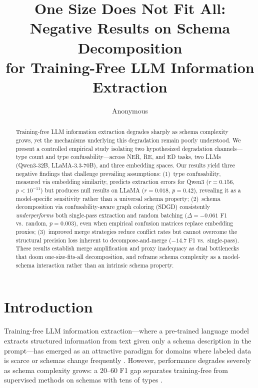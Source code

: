 \documentclass[11pt,a4paper]{article}
\title{One Size Does Not Fit All: Negative Results on Schema Decomposition\\for Training-Free LLM Information Extraction}
\author{Anonymous}
\date{}
\begin{document}
\maketitle

\begin{abstract}
Training-free LLM information extraction degrades sharply as schema complexity grows, yet the mechanisms underlying this degradation remain poorly understood. We present a controlled empirical study isolating two hypothesized degradation channels---type count and type confusability---across NER, RE, and ED tasks, two LLMs (Qwen3-32B, LLaMA-3.3-70B), and three embedding spaces. Our results yield three negative findings that challenge prevailing assumptions: (1)~type confusability, measured via embedding similarity, predicts extraction errors for Qwen3 ($r{=}0.156$, $p{<}10^{-11}$) but produces null results on LLaMA ($r{=}0.018$, $p{=}0.42$), revealing it as a model-specific sensitivity rather than a universal schema property; (2)~schema decomposition via confusability-aware graph coloring (SDGD) consistently \emph{underperforms} both single-pass extraction and random batching ($\Delta{=}{-}0.061$ F1 vs.\ random, $p{=}0.003$), even when empirical confusion matrices replace embedding proxies; (3)~improved merge strategies reduce conflict rates but cannot overcome the structural precision loss inherent to decompose-and-merge ($-14.7$ F1 vs.\ single-pass). These results establish merge amplification and proxy inadequacy as dual bottlenecks that doom one-size-fits-all decomposition, and reframe schema complexity as a model-schema interaction rather than an intrinsic schema property.
\end{abstract}

\section{Introduction}
\label{sec:intro}

Training-free LLM information extraction---where a pre-trained language model extracts structured information from text given only a schema description in the prompt---has emerged as an attractive paradigm for domains where labeled data is scarce or schemas change frequently \cite{wang2023gptner,li2023evaluating}. However, performance degrades severely as schema complexity grows: a 20--60 F1 gap separates training-free from supervised methods on schemas with tens of types \cite{lu2023chameleon}.
\end{document}
